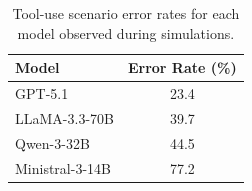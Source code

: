 \begin{table}[!t]
\centering
\small
\begin{tabular}{lc}
\toprule
\textbf{Model} & \textbf{Error Rate (\%)} \\
\midrule
GPT-5.1            & 23.4 \\
LLaMA-3.3-70B      & 39.7 \\
Qwen-3-32B         & 44.5 \\
Ministral-3-14B    & 77.2 \\
\bottomrule
\end{tabular}
\caption{Tool-use scenario error rates for each model observed during simulations.}
\label{tab:error-rate}
\end{table}